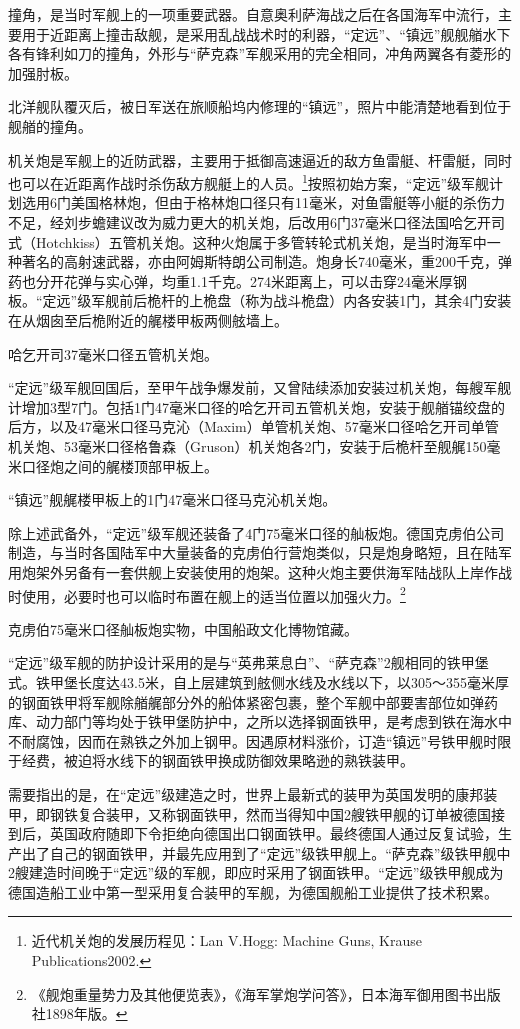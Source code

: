 \documentclass[12pt,UTF8]{ctexbook}
\begin{document}
撞角，是当时军舰上的一项重要武器。自意奥利萨海战之后在各国海军中流行，主要用于近距离上撞击敌舰，是采用乱战战术时的利器，“定远”、“镇远”舰舰艏水下各有锋利如刀的撞角，外形与“萨克森”军舰采用的完全相同，冲角两翼各有菱形的加强肘板。

北洋舰队覆灭后，被日军送在旅顺船坞内修理的“镇远”，照片中能清楚地看到位于舰艏的撞角。

机关炮是军舰上的近防武器，主要用于抵御高速逼近的敌方鱼雷艇、杆雷艇，同时也可以在近距离作战时杀伤敌方舰艇上的人员。\footnote{近代机关炮的发展历程见：Lan V.Hogg: Machine Guns, Krause Publications2002.}按照初始方案，“定远”级军舰计划选用6门美国格林炮，但由于格林炮口径只有11毫米，对鱼雷艇等小艇的杀伤力不足，经刘步蟾建议改为威力更大的机关炮，后改用6门37毫米口径法国哈乞开司式（Hotchkiss）五管机关炮。这种火炮属于多管转轮式机关炮，是当时海军中一种著名的高射速武器，亦由阿姆斯特朗公司制造。炮身长740毫米，重200千克，弹药也分开花弹与实心弹，均重1.1千克。274米距离上，可以击穿24毫米厚钢板。“定远”级军舰前后桅杆的上桅盘（称为战斗桅盘）内各安装1门，其余4门安装在从烟囱至后桅附近的艉楼甲板两侧舷墙上。

哈乞开司37毫米口径五管机关炮。

“定远”级军舰回国后，至甲午战争爆发前，又曾陆续添加安装过机关炮，每艘军舰计增加3型7门。包括1门47毫米口径的哈乞开司五管机关炮，安装于舰艏锚绞盘的后方，以及47毫米口径马克沁（Maxim）单管机关炮、57毫米口径哈乞开司单管机关炮、53毫米口径格鲁森（Gruson）机关炮各2门，安装于后桅杆至舰艉150毫米口径炮之间的艉楼顶部甲板上。

“镇远”舰艉楼甲板上的1门47毫米口径马克沁机关炮。

除上述武备外，“定远”级军舰还装备了4门75毫米口径的舢板炮。德国克虏伯公司制造，与当时各国陆军中大量装备的克虏伯行营炮类似，只是炮身略短，且在陆军用炮架外另备有一套供舰上安装使用的炮架。这种火炮主要供海军陆战队上岸作战时使用，必要时也可以临时布置在舰上的适当位置以加强火力。\footnote{《舰炮重量势力及其他便览表》，《海军掌炮学问答》，日本海军御用图书出版社1898年版。}

克虏伯75毫米口径舢板炮实物，中国船政文化博物馆藏。

“定远”级军舰的防护设计采用的是与“英弗莱息白”、“萨克森”2舰相同的铁甲堡式。铁甲堡长度达43.5米，自上层建筑到舷侧水线及水线以下，以305～355毫米厚的钢面铁甲将军舰除艏艉部分外的船体紧密包裹，整个军舰中部要害部位如弹药库、动力部门等均处于铁甲堡防护中，之所以选择钢面铁甲，是考虑到铁在海水中不耐腐蚀，因而在熟铁之外加上钢甲。因遇原材料涨价，订造“镇远”号铁甲舰时限于经费，被迫将水线下的钢面铁甲换成防御效果略逊的熟铁装甲。

需要指出的是，在“定远”级建造之时，世界上最新式的装甲为英国发明的康邦装甲，即钢铁复合装甲，又称钢面铁甲，然而当得知中国2艘铁甲舰的订单被德国接到后，英国政府随即下令拒绝向德国出口钢面铁甲。最终德国人通过反复试验，生产出了自己的钢面铁甲，并最先应用到了“定远”级铁甲舰上。“萨克森”级铁甲舰中2艘建造时间晚于“定远”级的军舰，即应时采用了钢面铁甲。“定远”级铁甲舰成为德国造船工业中第一型采用复合装甲的军舰，为德国舰船工业提供了技术积累。
\end{document}
